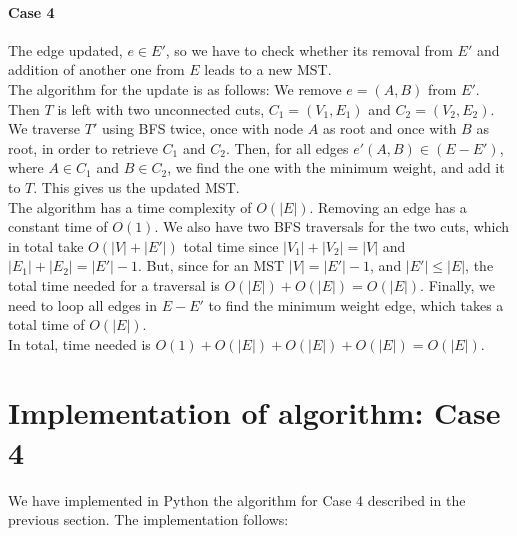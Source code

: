\documentclass[a4paper,11pt]{article}
\begin{document}
\paragraph{Case 4}
The edge updated, $e\in E'$, so we have to check whether its removal from $E'$ and addition of another one from $E$ leads to a new MST.\\
The algorithm for the update is as follows: We remove $e=(A,B)$ from $E'$. Then $T$ is left with two unconnected cuts, $C_{1}=(V_{1},E_{1})$ and $C_{2}=(V_{2},E_{2})$. We traverse $T'$ using BFS twice, once with node $A$ as root and once with $B$ as root, in order to retrieve $C_{1}$ and $C_{2}$. Then, for all edges $e'(A,B)\in (E-E')$, where $A\in C_{1}$ and $B\in C_{2}$, we find the one with the minimum weight, and add it to $T$. This gives us the updated MST.\\
The algorithm has a time complexity of $O(|E|)$. Removing an edge has a constant time of $O(1)$. We also have two BFS traversals for the two cuts, which in total take $O(|V|+|E'|)$ total time since $|V_{1}|+|V_{2}|=|V|$ and $|E_{1}|+|E_{2}|=|E'| -1$. But, since for an MST $|V|=|E'|-1$, and $|E'| \leq |E|$, the total time needed for a traversal is $O(|E|)+O(|E|)=O(|E|)$. Finally, we need to loop all edges in $E-E'$ to find the minimum weight edge, which takes a total time of $O(|E|)$.\\
In total, time needed is $O(1)+O(|E|)+O(|E|)+O(|E|)=O(|E|)$.\\

\section {Implementation of algorithm: Case 4}
We have implemented in Python the algorithm for Case 4 described in the previous section. The implementation follows:
\end{document}
